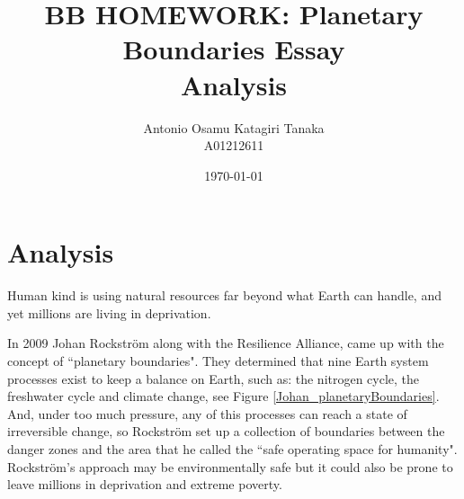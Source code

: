 \documentclass[11pt,a4paper]{article}
\title
{
    BB HOMEWORK: Planetary Boundaries Essay \\
    Analysis
}
\author
{
    Antonio Osamu Katagiri Tanaka \\
    A01212611
}
\date{\today}
\providecommand{\keywords}[1]
{
    \\
    \\
    \small
    \textbf{\textit{Keywords:}} #1
}
\begin{document}

\maketitle


\clearpage






\section{Analysis}\label{sec:intro}
Human kind is using natural resources far beyond what Earth can handle, and yet millions are living in deprivation.

In 2009 Johan Rockström along with the Resilience Alliance, came up with the concept of ``planetary boundaries". They determined that nine Earth system processes exist to keep a balance on Earth, such as: the nitrogen cycle, the freshwater cycle and climate change, see Figure \ref{Johan_planetaryBoundaries}. And, under too much pressure, any of this processes can reach a state of irreversible change, so Rockström set up a collection of boundaries between the danger zones and the area that he called the ``safe operating space for humanity". \parencite{Rockstrom2009} Rockström's approach may be environmentally safe but it could also be prone to leave millions in deprivation and extreme poverty.
\end{document}
